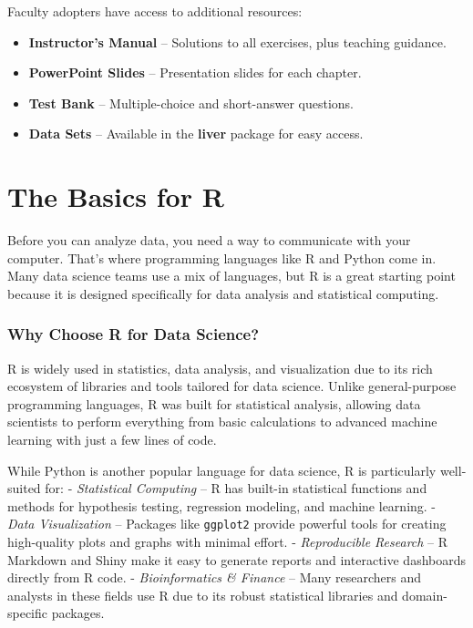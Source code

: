 \documentclass[
]{book}
\newcommand{\passthrough}[1]{#1}
\providecommand{\tightlist}{%
  \setlength{\itemsep}{0pt}\setlength{\parskip}{0pt}}
\theoremstyle{definition}
\theoremstyle{definition}
\theoremstyle{definition}
\theoremstyle{definition}
\theoremstyle{remark}
\begin{document}
Faculty adopters have access to additional resources:

\begin{itemize}
\tightlist
\item
  \textbf{Instructor's Manual} -- Solutions to all exercises, plus teaching guidance.\\
\item
  \textbf{PowerPoint Slides} -- Presentation slides for each chapter.\\
\item
  \textbf{Test Bank} -- Multiple-choice and short-answer questions.\\
\item
  \textbf{Data Sets} -- Available in the \textbf{liver} package for easy access.
\end{itemize}

\chapter{The Basics for R}\label{chapter-into-R}

Before you can analyze data, you need a way to communicate with your computer. That's where programming languages like R and Python come in. Many data science teams use a mix of languages, but R is a great starting point because it is designed specifically for data analysis and statistical computing.

\subsection*{Why Choose R for Data Science?}\label{why-choose-r-for-data-science}

R is widely used in statistics, data analysis, and visualization due to its rich ecosystem of libraries and tools tailored for data science. Unlike general-purpose programming languages, R was built for statistical analysis, allowing data scientists to perform everything from basic calculations to advanced machine learning with just a few lines of code.

While Python is another popular language for data science, R is particularly well-suited for:
- \emph{Statistical Computing} -- R has built-in statistical functions and methods for hypothesis testing, regression modeling, and machine learning.
- \emph{Data Visualization} -- Packages like \passthrough{\lstinline!ggplot2!} provide powerful tools for creating high-quality plots and graphs with minimal effort.
- \emph{Reproducible Research} -- R Markdown and Shiny make it easy to generate reports and interactive dashboards directly from R code.
- \emph{Bioinformatics \& Finance} -- Many researchers and analysts in these fields use R due to its robust statistical libraries and domain-specific packages.
\end{document}
